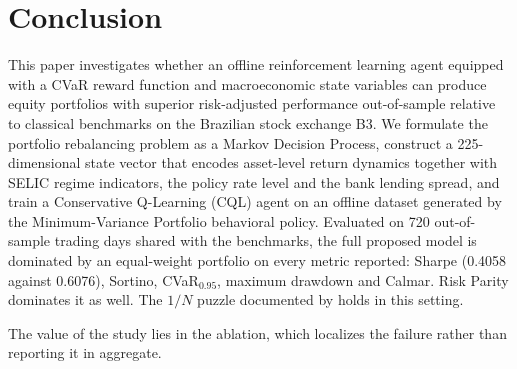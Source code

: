 \section{Conclusion}
\label{sec:conclusion}

This paper investigates whether an offline reinforcement learning agent equipped with
a CVaR reward function and macroeconomic state variables can produce equity portfolios
with superior risk-adjusted performance out-of-sample relative to classical benchmarks
on the Brazilian stock exchange B3.
We formulate the portfolio rebalancing problem as a Markov Decision Process, construct
a 225-dimensional state vector that encodes asset-level return dynamics together with
SELIC regime indicators, the policy rate level and the bank lending spread, and train a
Conservative Q-Learning (CQL) agent on an offline dataset generated by the
Minimum-Variance Portfolio behavioral policy.
Evaluated on 720 out-of-sample trading days shared with the benchmarks, the full
proposed model is dominated by an equal-weight portfolio on every metric reported:
Sharpe (0.4058 against 0.6076), Sortino, CVaR$_{0.95}$, maximum drawdown and
Calmar.
Risk Parity dominates it as well.
The $1/N$ puzzle documented by \citet{DeMiguel2007} holds in this setting.

The value of the study lies in the ablation, which localizes the failure rather
than reporting it in aggregate.

